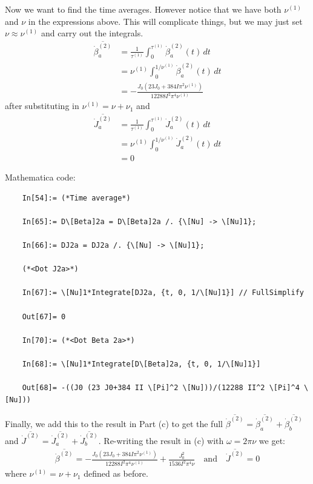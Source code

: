 \documentclass{article}
\theoremstyle{definition}
\newcommand{\be}{\beta}
\newcommand{\f}[2]{\frac{#1}{#2}}
\begin{document}
\begin{enumerate}[label=(\alph*)]
	Now we want to find the time averages. However notice that we have both $\nu^{(1)}$ and $\nu$ in the expressions above. This will complicate things, but we may just set $\nu \approx \nu^{(1)}$ and carry out the integrals. 
	\begin{align*}
	\overline{\dot \be_a^{(2)}} 
	&= \f{1}{\tau^{(1)}}\int_0^{\tau^{(1)}} \dot \be_a^{(2)}(t) \,dt\\
	&= \nu^{(1)} \int_0^{1/\nu^{(1)}}   \dot \be_a^{(2)}(t) \,dt\\ 
	&= \boxed{-\f{J_0(23J_0 + 384 I \pi^2 \nu^{(1)})}{12288 I^2 \pi^4 \nu^{(1)}}}
	\end{align*}
	after substituting in $\nu^{(1)} = \nu + \nu_1$ and 
	\begin{align*}
	\overline{\dot J_a^{(2)}} 
	&= \f{1}{\tau^{(1)}}\int_0^{\tau^{(1)}} \dot J_a^{(2)}(t) \,dt\\
	&= \nu^{(1)} \int_0^{1/\nu^{(1)}}   \dot J_a^{(2)}(t) \,dt\\ 
	&= \boxed{0}
	\end{align*}
	
	Mathematica code:
	\begin{lstlisting}
	In[54]:= (*Time average*)
	
	In[65]:= D\[Beta]2a = D\[Beta]2a /. {\[Nu] -> \[Nu]1};
	
	In[66]:= DJ2a = DJ2a /. {\[Nu] -> \[Nu]1};
	
	(*<Dot J2a>*)
	
	In[67]:= \[Nu]1*Integrate[DJ2a, {t, 0, 1/\[Nu]1}] // FullSimplify
	
	Out[67]= 0
	
	In[70]:= (*<Dot Beta 2a>*)
	
	In[68]:= \[Nu]1*Integrate[D\[Beta]2a, {t, 0, 1/\[Nu]1}]
	
	Out[68]= -((J0 (23 J0+384 II \[Pi]^2 \[Nu]))/(12288 II^2 \[Pi]^4 \[Nu])) 
	\end{lstlisting}
	
	
	Finally, we add this to the result in Part (c) to get the full $\overline{\dot\be^{(2)}} = \overline{\dot\be_a^{(2)}} + \overline{\dot\be_b^{(2)}}$ and $\overline{\dot J^{(2)}} = \overline{\dot  J_a^{(2)}} + \overline{\dot J_b^{(2)}}$. Re-writing the result in (c) with $\omega = 2\pi \nu$ we get:
	\begin{align*}
	\boxed{\overline{\dot\be^{(2)}} =-\f{J_0(23J_0 + 384 I \pi^2 \nu^{(1)})}{12288 I^2 \pi^4 \nu^{(1)}} + \f{J_0^2}{1536 I^2 \pi^4 \nu}} \quad\text{and} \quad \boxed{\overline{\dot J^{(2)}} = 0}
	\end{align*}
	where $\nu^{(1)} = \nu + \nu_1$ defined as before. 
	
	
\end{enumerate}
\end{document}
